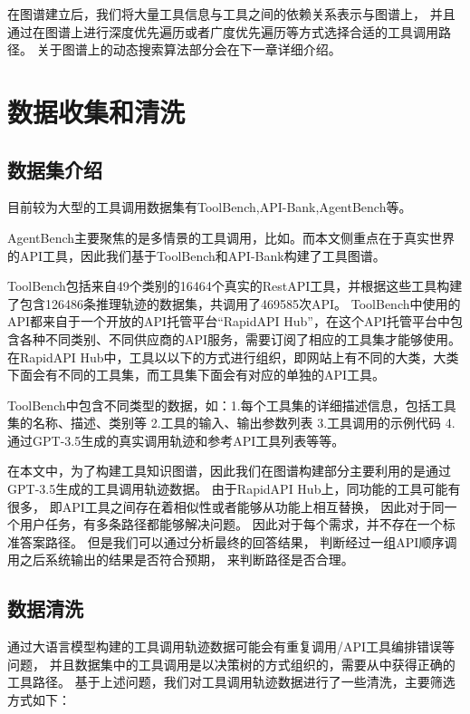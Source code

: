 在图谱建立后，我们将大量工具信息与工具之间的依赖关系表示与图谱上，
并且通过在图谱上进行深度优先遍历或者广度优先遍历等方式选择合适的工具调用路径。
关于图谱上的动态搜索算法部分会在下一章详细介绍。

\section{数据收集和清洗}

\subsection{数据集介绍}

目前较为大型的工具调用数据集有ToolBench\cite{Qin2023},API-Bank\cite{Li2023c},AgentBench\cite{Liu2023b}等。

AgentBench主要聚焦的是多情景的工具调用，比如。而本文侧重点在于真实世界的API工具，因此我们基于ToolBench和API-Bank构建了工具图谱。

ToolBench包括来自49个类别的16464个真实的RestAPI工具，并根据这些工具构建了包含126486条推理轨迹的数据集，共调用了469585次API。
ToolBench中使用的API都来自于一个开放的API托管平台“RapidAPI Hub”，在这个API托管平台中包含各种不同类别、不同供应商的API服务，需要订阅了相应的工具集才能够使用。在RapidAPI Hub中，工具以以下的方式进行组织，即网站上有不同的大类，大类下面会有不同的工具集，而工具集下面会有对应的单独的API工具。

ToolBench中包含不同类型的数据，如：1.每个工具集的详细描述信息，包括工具集的名称、描述、类别等 2.工具的输入、输出参数列表 3.工具调用的示例代码 4.通过GPT-3.5生成的真实调用轨迹和参考API工具列表等等。

在本文中，为了构建工具知识图谱，因此我们在图谱构建部分主要利用的是通过GPT-3.5生成的工具调用轨迹数据。
由于RapidAPI Hub上，同功能的工具可能有很多，
即API工具之间存在着相似性或者能够从功能上相互替换，
因此对于同一个用户任务，有多条路径都能够解决问题。
因此对于每个需求，并不存在一个标准答案路径。
但是我们可以通过分析最终的回答结果，
判断经过一组API顺序调用之后系统输出的结果是否符合预期，
来判断路径是否合理。

\subsection{数据清洗}

通过大语言模型构建的工具调用轨迹数据可能会有重复调用/API工具编排错误等问题，
并且数据集中的工具调用是以决策树的方式组织的，需要从中获得正确的工具路径。
基于上述问题，我们对工具调用轨迹数据进行了一些清洗，主要筛选方式如下：

